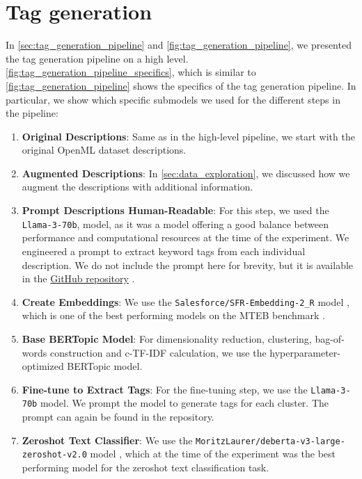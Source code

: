\section{Tag generation}
\label{sec:tag_generation_results}
In \cref{sec:tag_generation_pipeline} and \cref{fig:tag_generation_pipeline}, we presented the tag generation pipeline on a high level. \cref{fig:tag_generation_pipeline_specifics}, which is similar to \cref{fig:tag_generation_pipeline} shows the specifics of the tag generation pipeline. In particular, we show which specific submodels we used for the different steps in the pipeline:
\begin{enumerate}
    \item \textbf{Original Descriptions}: Same as in the high-level pipeline, we start with the original OpenML dataset descriptions.
    \item \textbf{Augmented Descriptions}: In \cref{sec:data_exploration}, we discussed how we augment the descriptions with additional information.
    \item \textbf{Prompt Descriptions Human-Readable}: For this step, we used the \texttt{Llama-3-70b}, model, as it was a model offering a good balance between performance and computational resources at the time of the experiment. We engineered a prompt to extract keyword tags from each individual description. We do not include the prompt here for brevity, but it is available in the \href{https://github.com/ivangermanov/openml-tags}{GitHub repository} \cite{germanov_topic_modeling_of_2024}.
    \item \textbf{Create Embeddings}: We use the \texttt{Salesforce/SFR-Embedding-2\_R} model \cite{noauthor_salesforcesfr-embedding-2_r_2024}, which is one of the best performing models on the MTEB benchmark \cite{muennighoff_mteb_2023}.
    \item \textbf{Base BERTopic Model}: For dimensionality reduction, clustering, bag-of-words construction and c-TF-IDF calculation, we use the hyperparameter-optimized BERTopic model.
    \item \textbf{Fine-tune to Extract Tags}: For the fine-tuning step, we use the \texttt{Llama-3-70b} model. We prompt the model to generate tags for each cluster. The prompt can again be found in the repository.
    \item \textbf{Zeroshot Text Classifier}: We use the \texttt{MoritzLaurer/deberta-v3-large-zeroshot-v2.0} model \cite{noauthor_moritzlaurerdeberta-v3-large-zeroshot-v20_2024}, which at the time of the experiment was the best performing model for the zeroshot text classification task.
\end{enumerate}

